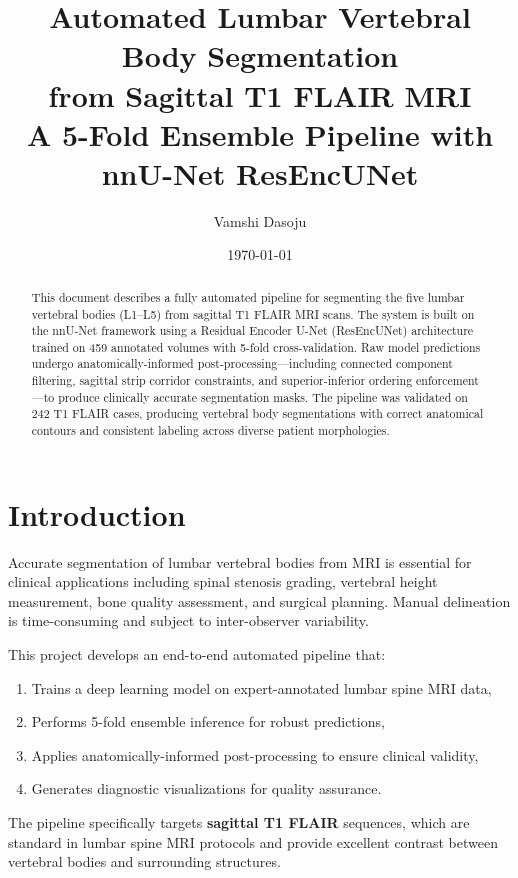\documentclass[12pt, a4paper]{article}
\title{
    \vspace{-1cm}
    \textbf{Automated Lumbar Vertebral Body Segmentation\\from Sagittal T1 FLAIR MRI}\\[0.5em]
    \large A 5-Fold Ensemble Pipeline with nnU-Net ResEncUNet
}
\author{Vamshi Dasoju}
\date{\today}
\begin{document}
\maketitle

\begin{abstract}
This document describes a fully automated pipeline for segmenting the five lumbar vertebral bodies (L1--L5) from sagittal T1 FLAIR MRI scans. The system is built on the nnU-Net framework using a Residual Encoder U-Net (ResEncUNet) architecture trained on 459 annotated volumes with 5-fold cross-validation. Raw model predictions undergo anatomically-informed post-processing---including connected component filtering, sagittal strip corridor constraints, and superior-inferior ordering enforcement---to produce clinically accurate segmentation masks. The pipeline was validated on 242 T1 FLAIR cases, producing vertebral body segmentations with correct anatomical contours and consistent labeling across diverse patient morphologies.
\end{abstract}

\tableofcontents
\newpage

\section{Introduction}

Accurate segmentation of lumbar vertebral bodies from MRI is essential for clinical applications including spinal stenosis grading, vertebral height measurement, bone quality assessment, and surgical planning. Manual delineation is time-consuming and subject to inter-observer variability.

This project develops an end-to-end automated pipeline that:
\begin{enumerate}[noitemsep]
    \item Trains a deep learning model on expert-annotated lumbar spine MRI data,
    \item Performs 5-fold ensemble inference for robust predictions,
    \item Applies anatomically-informed post-processing to ensure clinical validity,
    \item Generates diagnostic visualizations for quality assurance.
\end{enumerate}

The pipeline specifically targets \textbf{sagittal T1 FLAIR} sequences, which are standard in lumbar spine MRI protocols and provide excellent contrast between vertebral bodies and surrounding structures.
\end{document}
